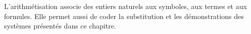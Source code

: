 \documentclass[../../../include/open-logic-chapter]{subfiles}
\begin{document}

L'arithmétisation associe des entiers naturels aux symboles, aux termes
et aux formules. Elle permet aussi de coder la substitution et les
démonstrations des systèmes présentés dans ce chapitre.









\OLEndChapterHook
\end{document}
